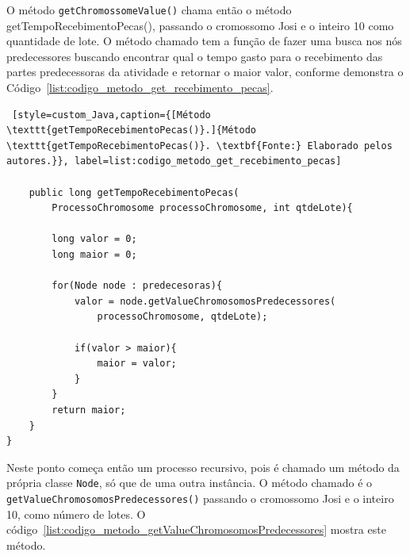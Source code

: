 \par O método \texttt{getChromossomeValue()} chama então o método getTempoRecebimentoPecas(), passando o cromossomo Josi e 
o inteiro 10 como quantidade de lote. O método chamado tem a função de fazer uma busca nos nós predecessores buscando encontrar 
qual o tempo gasto para o recebimento das partes predecessoras da atividade e retornar o maior valor, 
conforme demonstra o Código~\ref{list:codigo_metodo_get_recebimento_pecas}.

\begin{lstlisting} [style=custom_Java,caption={[Método \texttt{getTempoRecebimentoPecas()}.]{Método \texttt{getTempoRecebimentoPecas()}. \textbf{Fonte:} Elaborado pelos autores.}}, label=list:codigo_metodo_get_recebimento_pecas] 	

	public long getTempoRecebimentoPecas(
		ProcessoChromosome processoChromosome, int qtdeLote){
		
		long valor = 0;
		long maior = 0;
		
		for(Node node : predecesoras){
			valor = node.getValueChromosomosPredecessores(
				processoChromosome, qtdeLote);
			
			if(valor > maior){
				maior = valor;
			}
		}
		return maior;
	}
}

\end{lstlisting}


\par Neste ponto começa então um processo recursivo, pois é chamado um método da
própria classe \texttt{Node}, só que de uma outra instância. O método chamado é o \texttt{getValueChromosomosPr\-edecessores()} 
passando o cromossomo Josi e o inteiro 10, como número de lotes. O código~\ref{list:codigo_metodo_getValueChromosomosPredecessores} 
mostra este método.



